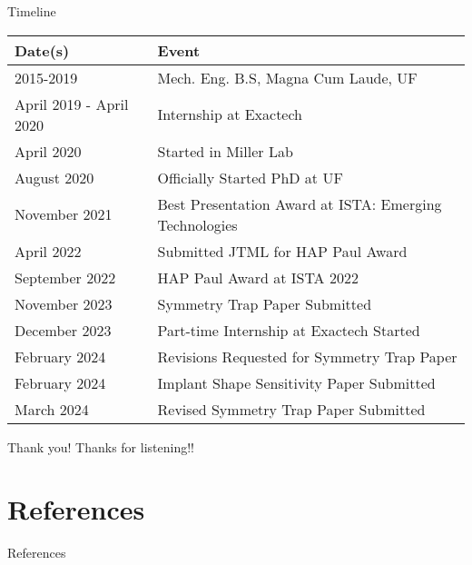 \documentclass[presentation, aspectratio=1610]{beamer}
\begin{document}
\begin{frame}[label={sec:orgfe41996}]{Timeline}
\begin{center}
\begin{tabular}{ll}
Date(s) & Event\\
\hline
2015-2019 & Mech. Eng. B.S, Magna Cum Laude, UF\\
April 2019 - April 2020 & Internship at Exactech\\
April 2020 & Started in Miller Lab\\
August 2020 & Officially Started PhD at UF\\
November 2021 & Best Presentation Award at ISTA: Emerging Technologies\\
April 2022 & Submitted JTML for HAP Paul Award\\
September 2022 & HAP Paul Award at ISTA 2022\\
November 2023 & Symmetry Trap Paper Submitted\\
December 2023 & Part-time Internship at Exactech Started\\
February 2024 & Revisions Requested for Symmetry Trap Paper\\
February 2024 & Implant Shape Sensitivity Paper Submitted\\
\hline
March 2024 & Revised Symmetry Trap Paper Submitted\\
\end{tabular}
\end{center}
\end{frame}
\begin{frame}[label={sec:org38fd1c5}]{Thank you!}
Thanks for listening!!
\end{frame}
\section{References}
\label{sec:org77b4ee9}
\begin{frame}[label={sec:orgae12195},fragile, allowframebreaks,  label=]{References}
\printbibliography
\end{frame}
\end{document}
